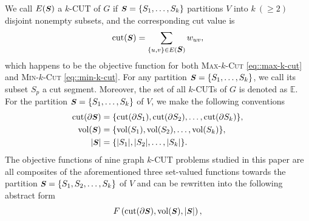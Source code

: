 \documentclass[12pt, a4paper]{article}%
\renewcommand{\vec}[1]{\mbox{\boldmath \small $#1$}}
\newcommand{\cut}{\mathrm{cut}}
\newcommand{\vol}{\mathrm{vol}}
\numberwithin{equation}{section}
\theoremstyle{plain}
\begin{document}
	We call $E(\vec S)$ a $k$-CUT of $G$ if $\vec S= \{S_1,\ldots,S_k\}$ partitions $V$ into $k~(\ge 2)$ disjoint nonempty subsets,
	and the corresponding cut value is 
	\begin{equation}
		\label{eq::cut-value}
		\cut(\vec S) = \sum_{\{u,v\}\in E(\vec S)} w_{uv},
	\end{equation}
	which happens to be the objective function for both \textsc{Max}-$k$-\textsc{Cut} \eqref{eq::max-k-cut} and \textsc{Min}-$k$-\textsc{Cut} \eqref{eq::min-k-cut}. For any partition $\vec S=\{S_1,\ldots,S_k\}$, we call its subset $S_p$ a cut segment.
	Moreover, the set of all $k$-CUTs of $G$ is denoted as $\mathbb{E}$.
	For the partition $\vec S= \{S_1,\ldots,S_k\}$ of $V$, we make the following conventions 
	\begin{align}
		\cut(\partial \vec S)&=\{\cut(\partial S_1), \cut(\partial S_2),\dots, \cut(\partial S_k)\},\label{eq::boundary}\\
		\vol(\vec S)&=\{\vol(S_1),\vol(S_2),\ldots,\vol(S_k)\},\label{eq::volume}\\
		|\vec S|&=\{ |S_1|,|S_2|,\ldots,|S_k|\}.\label{eq::card}
	\end{align}
	The objective functions of nine graph $k$-CUT problems studied in this paper are all composites of the aforementioned three set-valued functions towards the partition $\vec S=\{S_1,S_2,\ldots,S_k\}$ of $V$ and can be rewritten into the following abstract form 
	\begin{equation}
		\label{obj}
		F\left(\cut(\partial \vec S),\vol(\vec S),|\vec S|\right),
	\end{equation}
\end{document}
